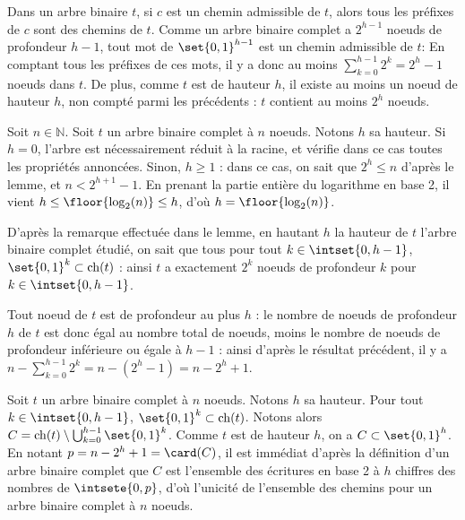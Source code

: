 \documentclass{scrartcl}
\begin{document}
			\begin{demo}
				\item Dans un arbre binaire $t$, si $c$ est un chemin admissible de $t$, alors tous les préfixes de $c$ sont des chemins de $t$.
					Comme un arbre binaire complet a $2^{h-1}$ noeuds de profondeur $h-1$, tout mot de $\set{0,1}^{h-1}$ est un chemin admissible de $t$:
					En comptant tous les préfixes de ces mots, il y a donc au moins $\sum_{k=0}^{h-1}2^k = 2^h-1$ noeuds dans $t$.
					De plus, comme $t$ est de hauteur $h$, il existe au moins un noeud de hauteur $h$, non compté parmi les précédents : $t$ contient au moins $2^h$ noeuds.
			\end{demo}

			\begin{demo}
				\item Soit $n \in \mathbb{N}$. Soit $t$ un arbre binaire complet à $n$ noeuds. Notons $h$ sa hauteur.
					Si $h = 0$, l'arbre est nécessairement réduit à la racine, et vérifie dans ce cas toutes les propriétés annoncées.
					Sinon, $h \geq 1$ : dans ce cas, on sait que $2^h \leq n$ d'après le lemme, 
					et $n < 2^{h+1}-1$. En prenant la partie entière du logarithme en base 2, il vient $h \leq \floor{\log_2(n)} \leq h$,
					d'où $h = \floor{\log_2(n)}$.
				\item D'après la remarque effectuée dans le lemme, en hautant $h$ la hauteur de $t$ l'arbre binaire complet étudié,
					on sait que tous pour tout $k \in \intset{0,h-1}$, $\set{0,1}^k \subset \mathrm{ch}(t)$ : 
					ainsi $t$ a exactement $2^k$ noeuds de profondeur $k$ pour $k \in \intset{0,h-1}$.
				\item Tout noeud de $t$ est de profondeur au plus $h$ : le nombre de noeuds de profondeur $h$ de $t$ est donc égal au nombre total
					de noeuds, moins le nombre de noeuds de profondeur inférieure ou égale à $h-1$ : ainsi d'après le résultat précédent,
					il y a $n - \sum_{k=0}^{h-1}2^k = n - (2^h-1) = n-2^h+1$.
				\item Soit $t$ un arbre binaire complet à $n$ noeuds. Notons $h$ sa hauteur. Pour tout $k \in \intset{0,h-1}$, $\set{0,1}^k \subset \mathrm{ch}(t)$.
					Notons alors $C = \mathrm{ch}(t) \setminus \bigcup_{k=0}^{h-1}\set{0,1}^k$. Comme $t$ est de hauteur $h$, on a $C \subset \set{0,1}^h$.
					En notant $p = n-2^h+1 = \card(C)$, il est immédiat d'après la définition d'un arbre binaire complet que $C$ est l'ensemble des écritures en base 2 à $h$ chiffres des nombres de $\intsete{0,p}$, d'où l'unicité de l'ensemble des chemins pour un arbre binaire complet à $n$ noeuds.
			\end{demo}
\end{document}
